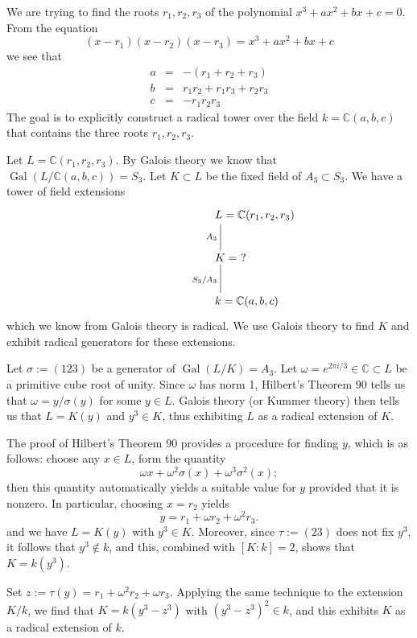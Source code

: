 \documentclass{article}
\newcommand{\C}{\mathbb{C}}
\newcommand{\Gal}{\operatorname{Gal}}
\begin{document}
We are trying to find the roots $r_1, r_2, r_3$ of the polynomial $x^3
+ ax^2 + bx + c = 0$. From the equation
$$
(x-r_1)(x-r_2)(x-r_3) = x^3 + ax^2 + bx + c
$$
we see that
\begin{eqnarray*}
a & = & -(r_1 + r_2 + r_3) \\
b & = & r_1 r_2 + r_1 r_3 + r_2 r_3 \\
c & = & -r_1 r_2 r_3
\end{eqnarray*}
The goal is to explicitly construct a radical tower over the field
$k = \C(a,b,c)$ that contains the three roots $r_1, r_2, r_3$.

Let $L = \C(r_1,r_2,r_3)$. By Galois theory we know that
$\Gal(L/\C(a,b,c)) = S_3$. Let $K \subset L$ be the fixed field of
$A_3 \subset S_3$. We have a tower of field extensions
$$
\xymatrix{
\makebox[1em][l]{$L = \C(r_1,r_2,r_3)$} \ar@{-}[d]_{A_3} \\
\makebox[1em][l]{$K =\ ?$} \ar@{-}[d]_{S_3/A_3} \\
\makebox[1em][l]{$k = \C(a,b,c)$}
}
$$
which we know from Galois theory is radical. We use Galois theory to find $K$ and exhibit radical generators for these extensions.

Let $\sigma := (123)$ be a generator of $\Gal(L/K) = A_3$. Let $\omega = e^{2 \pi i/3} \in \C \subset L$ be a primitive cube root of unity. Since $\omega$ has norm 1, Hilbert's Theorem 90 tells us that $\omega = y/\sigma(y)$ for some $y \in L$. Galois theory (or Kummer theory) then tells us that $L = K(y)$ and $y^3 \in K$, thus exhibiting $L$ as a radical extension of $K$.

The proof of Hilbert's Theorem 90 provides a procedure for finding $y$, which is as follows: choose any $x \in L$, form the quantity
$$
\omega x + \omega^2 \sigma(x) + \omega^3 \sigma^2(x);
$$
then this quantity automatically yields a suitable value for $y$ provided that it is nonzero. In particular, choosing $x = r_2$ yields
$$
y = r_1 + \omega r_2 + \omega^2 r_3.
$$
and we have $L = K(y)$ with $y^3 \in K$. Moreover, since $\tau := (23)$ does not fix $y^3$, it follows that $y^3 \notin k$, and this, combined with $[K:k] = 2$, shows that $K = k(y^3)$.

Set $z := \tau(y) = r_1 + \omega^2 r_2 + \omega r_3$. Applying the same technique to the extension $K/k$, we find that $K = k(y^3 - z^3)$ with $(y^3-z^3)^2 \in k$, and this exhibits $K$ as a radical extension of $k$.
\end{document}
